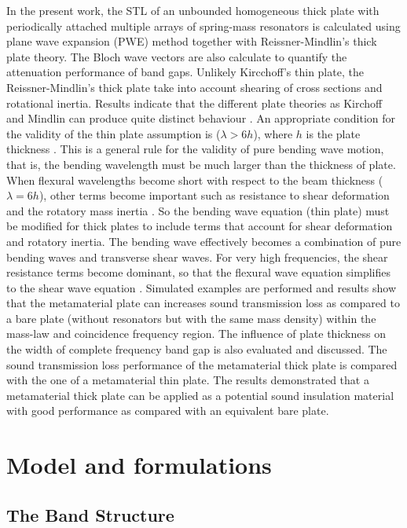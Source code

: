 \documentclass[a4paper]{ICEDyn}
\begin{document}
In the present work, the STL of an unbounded homogeneous thick plate with periodically attached multiple arrays of spring-mass resonators is calculated using plane wave expansion (PWE) method together with Reissner-Mindlin's thick plate theory. The Bloch wave vectors are also calculate to quantify the attenuation performance of band gaps. Unlikely Kircchoff's thin plate, the Reissner-Mindlin's thick plate take into account shearing of cross sections and rotational inertia. Results indicate that the different plate theories as Kirchoff and Mindlin can produce quite distinct behaviour \cite{Norris}. An appropriate condition for the validity of the thin plate assumption is ($\lambda > 6h$), where $h$ is the plate thickness \cite{Cremer}. This is a general rule for the validity of pure bending wave motion, that is, the bending wavelength must be much larger than the thickness of plate. When flexural wavelengths become short with respect to the beam thickness ($\lambda = 6h$), other terms become important such as resistance to shear deformation and the rotatory mass inertia \cite{Hambric}. So the bending wave equation (thin plate) must be modified for thick plates to include terms that account for shear deformation and rotatory inertia. The bending wave effectively becomes a combination of pure bending waves and transverse shear waves. For very high frequencies, the shear resistance terms become dominant, so that the flexural wave equation simplifies to the shear wave equation \cite{Hambric}. Simulated examples are performed and results show that the metamaterial plate can increases sound transmission loss as compared to a bare plate (without resonators but with the same mass density) within the mass-law and coincidence frequency region. The influence of plate thickness on the width of complete frequency band gap is also evaluated and discussed. The sound transmission loss performance of the metamaterial thick plate is compared with the one of a metamaterial thin plate. The results demonstrated that a metamaterial thick plate can be applied as a potential sound insulation material with good performance as compared with an equivalent bare plate.  	
	
	\section{Model and formulations}
	
	\subsection{The Band Structure}
	
\end{document}
